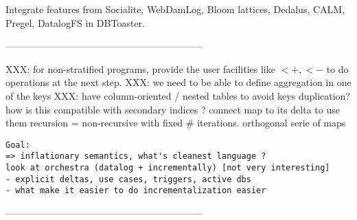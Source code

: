 \documentclass[11pt]{article}
\begin{document}
Integrate features from
Socialite\cite{socialite},
WebDamLog\cite{webdamlog},
Bloom lattices\cite{bloom_lattices},
Dedalus\cite{dedalus},
CALM\cite{bloom_calm},
Pregel\cite{pregel},
DatalogFS\cite{datalog_fs} in DBToaster\cite{dbtoaster09,dbtoaster11}.

--------------------------------------------------------------

{\color{red}
XXX: for non-stratified programs, provide the user facilities like $<+, <-$ to do operations at the next step.
XXX: we need to be able to define aggregation in one of the keys
XXX: have column-oriented / nested tables to avoid keys duplication? how is this compatible with secondary indices ?}
connect map to its delta to use them
recursion = non-recursive with fixed \# iterations. orthogonal serie of maps
\begin{verbatim}
Goal:
=> inflationary semantics, what's cleanest language ?
look at orchestra (datalog + incrementally) [not very interesting]
- explicit deltas, use cases, triggers, active dbs
- what make it easier to do incrementalization easier
\end{verbatim}

--------------------------------------------------------------

\def\pdfurl#1{\href{#1}{\footnotesize pdf}}
{\small }
\end{document}
